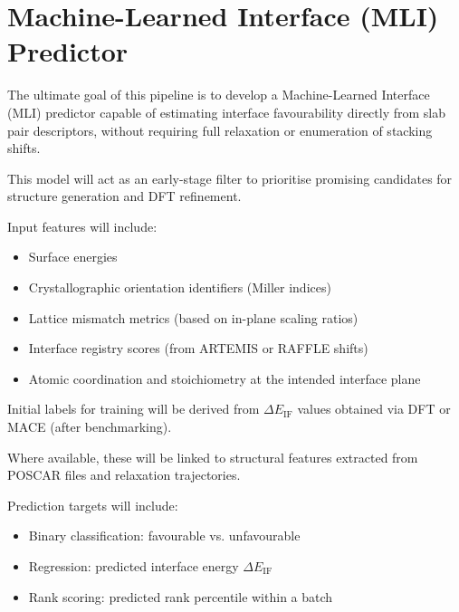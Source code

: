 \section{Machine-Learned Interface (MLI) Predictor}


The ultimate goal of this pipeline is to develop a Machine-Learned Interface (MLI) predictor capable of estimating
interface favourability directly from slab pair descriptors, without requiring full relaxation or enumeration of
stacking shifts.

This model will act as an early-stage filter to prioritise promising candidates for structure generation and DFT
refinement.


Input features will include:


\begin{itemize}
    \item Surface energies
    \item Crystallographic orientation identifiers (Miller indices)
    \item Lattice mismatch metrics (based on in-plane scaling ratios)
    \item Interface registry scores (from ARTEMIS or RAFFLE shifts)
    \item Atomic coordination and stoichiometry at the intended interface plane
\end{itemize}


Initial labels for training will be derived from \( \Delta E_\mathrm{IF} \) values obtained via DFT or MACE (after
benchmarking).

Where available, these will be linked to structural features extracted from POSCAR files and relaxation trajectories.


Prediction targets will include:


\begin{itemize}
    \item Binary classification: favourable vs. unfavourable
    \item Regression: predicted interface energy \( \Delta E_\mathrm{IF} \)
    \item Rank scoring: predicted rank percentile within a batch
\end{itemize}

